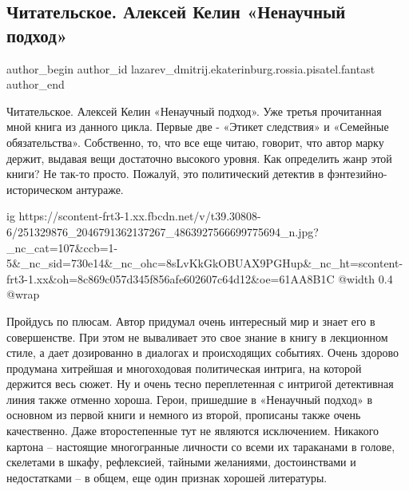  
 
 
 
 
 
\subsection{Читательское. Алексей Келин «Ненаучный подход»}
\label{sec:06_11_2021.fb.lazarev_dmitrij.ekaterinburg.rossia.pisatel.fantast.1.aleksej_kelin_nenauchnyj_podhod}
 
\ifcmt
 author_begin
   author_id lazarev_dmitrij.ekaterinburg.rossia.pisatel.fantast
 author_end
\fi

Читательское. Алексей Келин «Ненаучный подход». Уже третья прочитанная мной
книга из данного цикла. Первые две - «Этикет следствия» и «Семейные
обязательства». Собственно, то, что все еще читаю, говорит, что автор марку
держит, выдавая вещи достаточно высокого уровня. Как определить жанр этой
книги? Не так-то просто. Пожалуй, это политический детектив в
фэнтезийно-историческом антураже.

\ifcmt
  ig https://scontent-frt3-1.xx.fbcdn.net/v/t39.30808-6/251329876_2046791362137267_4863927566699775694_n.jpg?_nc_cat=107&ccb=1-5&_nc_sid=730e14&_nc_ohc=8sLvKkGkOBUAX9PGHup&_nc_ht=scontent-frt3-1.xx&oh=8c869c057d345f856afe602607c64d12&oe=61AA8B1C
  @width 0.4
  @wrap 
\fi

Пройдусь по плюсам. Автор придумал очень интересный мир и знает его в
совершенстве. При этом не вываливает это свое знание в книгу в лекционном
стиле, а дает дозированно в диалогах и происходящих событиях. Очень здорово
продумана хитрейшая и многоходовая политическая интрига, на которой держится
весь сюжет. Ну и очень тесно переплетенная с интригой детективная линия также
отменно хороша. Герои, пришедшие в «Ненаучный подход» в основном из первой
книги и немного из второй, прописаны также очень качественно. Даже
второстепенные тут не являются исключением. Никакого картона – настоящие
многогранные личности со всеми их тараканами в голове, скелетами в шкафу,
рефлексией, тайными желаниями, достоинствами и недостатками – в общем, еще один
признак хорошей литературы.


